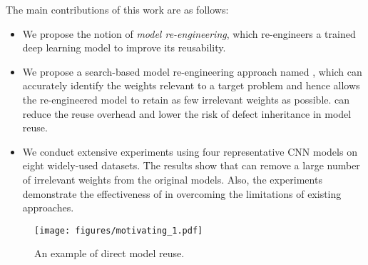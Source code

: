 The main contributions of this work are as follows:  
\begin{itemize}[leftmargin=*]
    \item We propose the notion of \textit{model re-engineering}, which re-engineers a trained deep learning model %
    to improve its reusability.
    \item We propose a search-based model re-engineering approach named \projectName, which can accurately identify the weights relevant to a target problem and hence allows the re-engineered model to retain as few irrelevant weights as possible. \projectName can reduce the reuse overhead and lower the risk of defect inheritance in model reuse.
    \item We conduct extensive experiments using four representative CNN models on eight widely-used datasets. The results show that \projectName can remove a large number of irrelevant weights from the original models. %
    Also, the experiments demonstrate the effectiveness of \projectName in overcoming the limitations of existing approaches.%
\end{itemize}

\begin{figure}[t]
    \centering
    \texttt{[image: figures/motivating\_1.pdf]}
    \caption{An example of direct model reuse.}%
    \label{fig:motivation_1}
\end{figure}